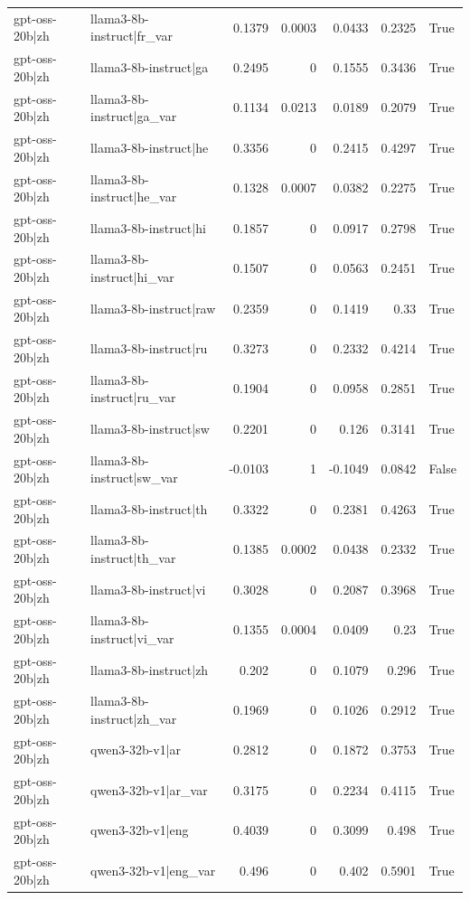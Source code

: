 \begin{table}
\begin{tabular}{l l r r r r l}
gpt-oss-20b|zh & llama3-8b-instruct|fr_var & 0.1379 & 0.0003 & 0.0433 & 0.2325 & True \\
gpt-oss-20b|zh & llama3-8b-instruct|ga & 0.2495 & 0 & 0.1555 & 0.3436 & True \\
gpt-oss-20b|zh & llama3-8b-instruct|ga_var & 0.1134 & 0.0213 & 0.0189 & 0.2079 & True \\
gpt-oss-20b|zh & llama3-8b-instruct|he & 0.3356 & 0 & 0.2415 & 0.4297 & True \\
gpt-oss-20b|zh & llama3-8b-instruct|he_var & 0.1328 & 0.0007 & 0.0382 & 0.2275 & True \\
gpt-oss-20b|zh & llama3-8b-instruct|hi & 0.1857 & 0 & 0.0917 & 0.2798 & True \\
gpt-oss-20b|zh & llama3-8b-instruct|hi_var & 0.1507 & 0 & 0.0563 & 0.2451 & True \\
gpt-oss-20b|zh & llama3-8b-instruct|raw & 0.2359 & 0 & 0.1419 & 0.33 & True \\
gpt-oss-20b|zh & llama3-8b-instruct|ru & 0.3273 & 0 & 0.2332 & 0.4214 & True \\
gpt-oss-20b|zh & llama3-8b-instruct|ru_var & 0.1904 & 0 & 0.0958 & 0.2851 & True \\
gpt-oss-20b|zh & llama3-8b-instruct|sw & 0.2201 & 0 & 0.126 & 0.3141 & True \\
gpt-oss-20b|zh & llama3-8b-instruct|sw_var & -0.0103 & 1 & -0.1049 & 0.0842 & False \\
gpt-oss-20b|zh & llama3-8b-instruct|th & 0.3322 & 0 & 0.2381 & 0.4263 & True \\
gpt-oss-20b|zh & llama3-8b-instruct|th_var & 0.1385 & 0.0002 & 0.0438 & 0.2332 & True \\
gpt-oss-20b|zh & llama3-8b-instruct|vi & 0.3028 & 0 & 0.2087 & 0.3968 & True \\
gpt-oss-20b|zh & llama3-8b-instruct|vi_var & 0.1355 & 0.0004 & 0.0409 & 0.23 & True \\
gpt-oss-20b|zh & llama3-8b-instruct|zh & 0.202 & 0 & 0.1079 & 0.296 & True \\
gpt-oss-20b|zh & llama3-8b-instruct|zh_var & 0.1969 & 0 & 0.1026 & 0.2912 & True \\
gpt-oss-20b|zh & qwen3-32b-v1|ar & 0.2812 & 0 & 0.1872 & 0.3753 & True \\
gpt-oss-20b|zh & qwen3-32b-v1|ar_var & 0.3175 & 0 & 0.2234 & 0.4115 & True \\
gpt-oss-20b|zh & qwen3-32b-v1|eng & 0.4039 & 0 & 0.3099 & 0.498 & True \\
gpt-oss-20b|zh & qwen3-32b-v1|eng_var & 0.496 & 0 & 0.402 & 0.5901 & True \\

\end{tabular}
\end{table}
